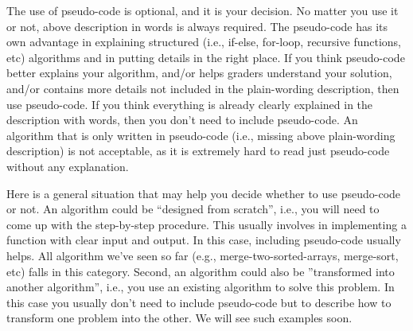 \documentclass[11pt]{article}
\begin{document}
The use of pseudo-code is optional, and it is your decision. No matter you use it or not, above description in words is always required. The pseudo-code has its own advantage in explaining structured (i.e., if-else, for-loop, recursive functions, etc) algorithms and in putting details in the right place. If you think pseudo-code better explains your algorithm, and/or helps graders understand your solution, and/or contains more details not included in the plain-wording description, then use pseudo-code. If you think everything is already clearly explained in the description with words, then you don't need to include pseudo-code. An algorithm that is only written in pseudo-code (i.e., missing above plain-wording description) is not acceptable, as it is extremely hard to read just pseudo-code without any explanation.

Here is a general situation that may help you decide whether to use pseudo-code or not. An algorithm could be ``designed from scratch'', i.e., you will need to come up with the step-by-step procedure. This usually involves in implementing a function with clear input and output. In this case, including pseudo-code usually helps. All algorithm we've seen so far (e.g., merge-two-sorted-arrays, merge-sort, etc) falls in this category. Second, an algorithm could also be ''transformed into another algorithm'', i.e., you use an existing algorithm to solve this problem. In this case you usually don't need to include pseudo-code but to describe how to transform one problem into the other. We will see such examples soon.

\clearpage\newpage
\end{document}

